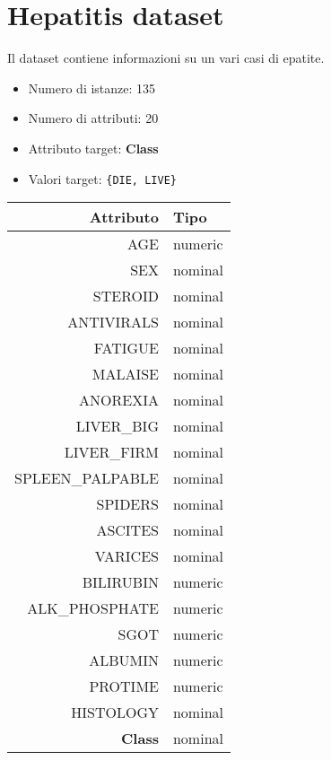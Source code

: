 \pagebreak

\section{Hepatitis dataset}

Il dataset contiene informazioni su un vari casi di epatite.


\begin{itemize}
	\item Numero di istanze: 135
	\item Numero di attributi: 20
	\item Attributo target: \textbf{Class}
	\item Valori target: \texttt{\{DIE, LIVE\}}
\end{itemize}

\begin{table}[ht]
	\centering
	\begin{tabular}{|r|l|}
		\hline
		Attributo        & Tipo    \\
		\hline
		AGE              & numeric \\
		SEX              & nominal \\
		STEROID          & nominal \\
		ANTIVIRALS       & nominal \\
		FATIGUE          & nominal \\
		MALAISE          & nominal \\
		ANOREXIA         & nominal \\
		LIVER\_BIG       & nominal \\
		LIVER\_FIRM      & nominal \\
		SPLEEN\_PALPABLE & nominal \\
		SPIDERS          & nominal \\
		ASCITES          & nominal \\
		VARICES          & nominal \\
		BILIRUBIN        & numeric \\
		ALK\_PHOSPHATE   & numeric \\
		SGOT             & numeric \\
		ALBUMIN          & numeric \\
		PROTIME          & numeric \\
		HISTOLOGY        & nominal \\
		\textbf{Class}   & nominal \\
		\hline
	\end{tabular}
\end{table}

